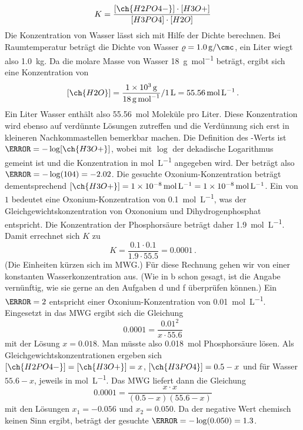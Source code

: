 \documentclass[DIV11]{scrartcl}
\begin{document}
\begin{solution}
  \begin{tasks}
    \task \[ K = \frac{[\ch{H2PO4-}]\cdot[H3O+]}{[H3PO4]\cdot[H2O]} \]
    \task Die Konzentration von Wasser lässt sich mit Hilfe der Dichte
      berechnen.  Bei Raumtemperatur beträgt die Dichte von Wasser $\varrho =
      \SI{1.0}{\gram\per\cmc}$, ein Liter wiegt also \SI{1.0}{\kilo\gram}.  Da
      die molare Masse von Wasser \SI{18}{\gram\per\mole} beträgt, ergibt sich
      eine Konzentration von
      \[
        [\ch{H2O}]
         = \frac{\SI{1e3}{\gram}}{\SI{18}{\gram\per\mole}}/\SI{1}{\liter}
         = \SI{55.56}{\mole\per\liter} \,.
      \]
      Ein Liter Wasser enthält also \SI{55.56}{\mole} Moleküle pro Liter.
      Diese Konzentration wird ebenso auf verdünnte Lösungen zutreffen und
      die Verdünnung sich erst in kleineren Nach\-komma\-stellen bemerkbar machen.
    \task Die Definition des \pH-Werts ist $\pH = -\log[\ch{H3O+}]$, wobei mit
      $\log$ der dekadische Logarithmus gemeint ist und die Konzentration in
      \si{\mole\per\liter} angegeben wird.  Der \pH{} beträgt also $\pH =
      -\log(104) = -2.02$.  Die gesuchte Oxonium-Konzentration beträgt
      dementsprechend $[\ch{H3O+}] =
      \SI[scientific-notation=true]{1e-8}{\mole\per\liter} =
      \SI{1e-8}{\mole\per\liter}$. 
    \task Ein \pH{} von $1$ bedeutet eine Oxonium-Konzentration von
      \SI{.1}{\mole\per\liter}, was der Gleichgewichtskonzentration von
      Oxononium und Dihydrogenphosphat entspricht.  Die Konzentration der
      Phosphorsäure beträgt daher \SI{1.9}{\mole\per\liter}.  Damit errechnet
      sich $K$ zu \[ K = \frac{0.1\cdot0.1}{1.9\cdot55.5} = 0.0001 \,. \]
      (Die Einheiten kürzen sich im MWG.)
    \task Für diese Rechnung gehen wir von einer konstanten
      Wasserkonzentration aus. (Wie in b schon gesagt, ist die Angabe
      vernünftig, wie sie gerne an den Aufgaben d und f überprüfen können.)
      Ein $\pH = 2$ entspricht einer Oxonium-Konzentration von
      \SI{0.01}{\mole\per\liter}.  Eingesetzt in das MWG ergibt sich die
      Gleichung \[ 0.0001 = \frac{0.01^2}{x\cdot 55.6} \] mit der Lösung
      $x=0.018$. Man müsste also \SI{0.018}{\mole} Phosphorsäure lösen.
    \task Als Gleichgewichtskonzentrationen ergeben sich $[\ch{H2PO4-}] =
      [\ch{H3O+}] = x$, $[\ch{H3PO4}]=0.5-x$ und für Wasser $55.6-x$, jeweils
      in \si{\mole\per\liter}.  Das MWG liefert dann die Gleichung
      \[ 0.0001 = \frac{x\cdot x}{(0.5-x)(55.6-x)} \] mit den Lösungen
      $x_1=-0.056$ und $x_2=0.050$.  Da der negative Wert chemisch keinen Sinn
      ergibt, beträgt der gesuchte $\pH = -\log(0.050) = 1.3$.
  \end{tasks}
\end{solution}
\end{document}
